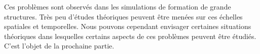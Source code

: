 			Ces problèmes sont observés dans les simulations de formation de grande structures. Très peu d'études théoriques peuvent être
			menées sur ces échelles spatiales et temporelles. Nous pouvons cependant envisager certaines situations théoriques dans
			lesquelles certains aspects de ces problèmes peuvent être étudiés. C'est l'objet de la prochaine partie.
